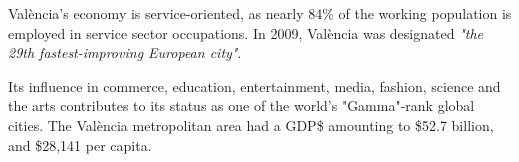 \documentclass{article}
\begin{document}
València's economy is service-oriented, as nearly 84\% of the working population is employed in service sector occupations. In 2009, València was designated \textit{"the 29th fastest-improving European city"}.  

Its influence in commerce, education, entertainment, media, fashion, science and the arts contributes to its status as one of the world's "Gamma"-rank global cities. The València metropolitan area had a GDP\$ amounting to \$52.7 billion, and \$28,141 per capita.
\end{document}
